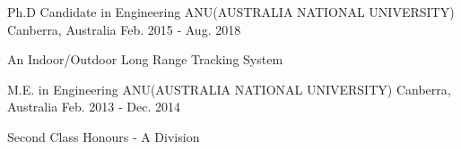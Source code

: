 

\begin{cventries}

  \cventry
    {Ph.D Candidate in Engineering} %
    {ANU(AUSTRALIA NATIONAL UNIVERSITY) } %
    {Canberra, Australia} %
    {Feb. 2015 ‑ Aug. 2018} %
    {
      \begin{cvitems} %
        \item {An Indoor/Outdoor Long Range Tracking System}
      \end{cvitems}
    }

  \cventry
    {M.E. in Engineering} %
    {ANU(AUSTRALIA NATIONAL UNIVERSITY)} %
    {Canberra, Australia} %
    {Feb. 2013 ‑ Dec. 2014} %
    {
      \begin{cvitems} %
        \item {Second Class Honours ‑ A Division}
      \end{cvitems}
    }

\end{cventries}
